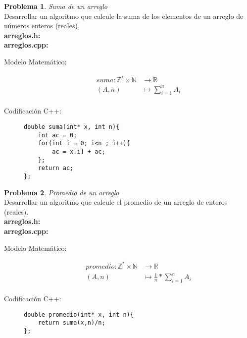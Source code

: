 \documentclass{article}
\theoremstyle{plain}
\theoremstyle{definition}
\newtheorem{problem}{Problema}
\begin{document}
\begin{problem} \emph{Suma de un arreglo}\\
Desarrollar un algoritmo que calcule la suma de los elementos de un arreglo de números enteros (reales).\\
\textbf{arreglos.h:}\ \\
\textbf{arreglos.cpp:}\ 
%
\begin{description}
\item[Modelo Matemático:]
%
\begin{align*}
suma: \mathbb{Z}^*\times\mathbb{N} &\to \mathbb{R}\\
(A,n) &\mapsto \sum_{i=1}^n A_i\\
\end{align*}
%
\item[Codificación \textsf{C++}:]\hfill
%
\begin{verbatim}
double suma(int* x, int n){
    int ac = 0;
    for(int i = 0; i<n ; i++){
        ac = x[i] + ac;
    };
    return ac;
};
\end{verbatim}
\end{description}
\end{problem}

\begin{problem} \emph{Promedio de un arreglo}\\
Desarrollar un algoritmo que calcule el promedio de un arreglo de enteros (reales).\\
\textbf{arreglos.h:}\ \\
\textbf{arreglos.cpp:}\ 
%
\begin{description}
\item[Modelo Matemático:]
%
\begin{align*}
promedio: \mathbb{Z}^*\times\mathbb{N} &\to \mathbb{R}\\
(A,n) &\mapsto \frac{1}{n}*\sum_{i=1}^n A_i\\
\end{align*}
%
\item[Codificación \textsf{C++}:]\hfill
%
\begin{verbatim}
double promedio(int* x, int n){
    return suma(x,n)/n;
};
\end{verbatim}
\end{description}
\end{problem}
\end{document}
